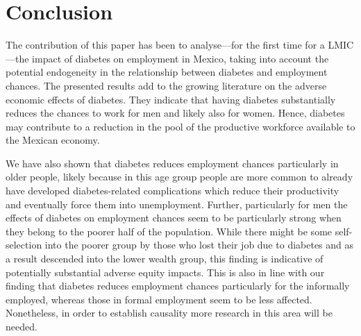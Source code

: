 \FloatBarrier
\section{\label{sec:Conclusion}Conclusion}

The contribution of this paper has been to analyse---for
the first time for a \ac{LMIC}---the impact of diabetes on employment
in Mexico, taking into account the potential endogeneity in the relationship
between diabetes and employment chances. The presented results add
to the growing literature on the adverse economic effects of diabetes.
They indicate that having diabetes substantially reduces the chances
to work for men and likely also for women. Hence, diabetes may contribute
to a reduction in the pool of the productive workforce available to
the Mexican economy. 

We have also shown that diabetes reduces employment chances
particularly in older people, likely because in this age group people
are more common to already have developed diabetes-related complications
which reduce their productivity and eventually force them into unemployment.
Further, particularly for men the effects of diabetes on employment
chances seem to be particularly strong when they belong to the poorer
half of the population. While there might be some self-selection into
the poorer group by those who lost their job due to diabetes and as
a result descended into the lower wealth group, this finding is indicative
of potentially substantial adverse equity impacts. This is also in
line with our finding that diabetes reduces employment chances particularly
for the informally employed, whereas those in formal employment seem
to be less affected. Nonetheless, in order to establish causality
more research in this area will be needed. 

